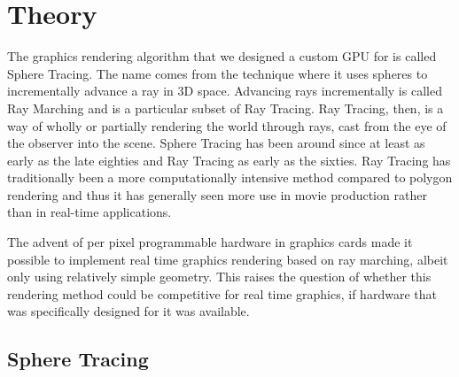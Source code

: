 \chapter{Theory}

	The graphics rendering algorithm that we designed a custom GPU for is called
	Sphere Tracing\cite{Hart1996}. The name comes from the technique where it 
	uses spheres to incrementally advance a ray in 3D space. Advancing rays 
	incrementally is called Ray Marching and is a particular subset of Ray
	Tracing.\cite{Whitted1980} Ray Tracing, then, is a way of wholly or
	partially rendering the world through rays, cast from the eye of the
	observer into the scene. Sphere Tracing has been around since at least as
	early as the late eighties and Ray Tracing as early as the
	sixties\cite{Hart1989,Appel1968}. Ray Tracing has traditionally been a 
	more computationally intensive method compared to polygon
	rendering\cite{Wylie1967} and thus it has generally seen more use in movie  
	production rather than in real-time applications.\cite{ref_needed?} 
	
	The advent of per pixel programmable hardware in graphics cards made it 
	possible to implement real time graphics rendering based on ray	marching, 
	albeit only using relatively simple geometry. This raises the question of 
	whether this rendering method could be competitive for real time graphics, 
	if hardware that was specifically designed for it was available.
	
		
	\section{Sphere Tracing} 

